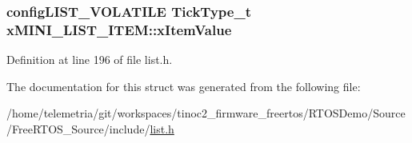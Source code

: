 \subsubsection[{\texorpdfstring{x\+Item\+Value}{xItemValue}}]{ {\bf config\+L\+I\+S\+T\+\_\+\+V\+O\+L\+A\+T\+I\+LE} {\bf Tick\+Type\+\_\+t} x\+M\+I\+N\+I\+\_\+\+L\+I\+S\+T\+\_\+\+I\+T\+E\+M\+::x\+Item\+Value}\hypertarget{structx_m_i_n_i___l_i_s_t___i_t_e_m_aae79c54ac1efa30959e68604cc23b29e}{}\label{structx_m_i_n_i___l_i_s_t___i_t_e_m_aae79c54ac1efa30959e68604cc23b29e}


Definition at line 196 of file list.\+h.



The documentation for this struct was generated from the following file\+:\begin{DoxyCompactItemize}
\item 
/home/telemetria/git/workspaces/tinoc2\+\_\+firmware\+\_\+freertos/\+R\+T\+O\+S\+Demo/\+Source/\+Free\+R\+T\+O\+S\+\_\+\+Source/include/\hyperlink{list_8h}{list.\+h}\end{DoxyCompactItemize}

